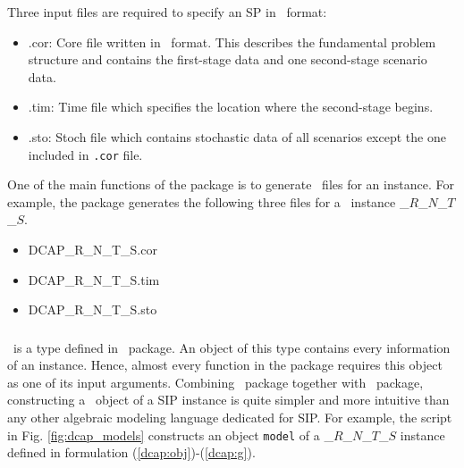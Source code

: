 Three input files are required to specify an SP in \smps\ format:
\begin{itemize}
	\item .cor: Core file written in \mps\ format. This describes the fundamental problem structure and contains the first-stage data and one second-stage scenario data.
	\item .tim: Time file which specifies the location where the second-stage begins.
	\item .sto: Stoch file which contains stochastic data of all scenarios except the one included in \texttt{.cor} file.
\end{itemize}
One of the main functions of the package is to generate \smps\ files for an instance. For example, the package generates the following three files for a \dcap\ instance \dcap\_$R$\_$N$\_$T$\_$S$.
\begin{itemize}
	\item DCAP\_R\_N\_T\_S.cor
	\item DCAP\_R\_N\_T\_S.tim
	\item DCAP\_R\_N\_T\_S.sto
\end{itemize}

\subsubsection{\jumpmodel}
\jumpmodel\ is a type defined in \jump\ package. An object of this type contains every information of an instance. Hence, almost every function in the package requires this object as one of its input arguments. Combining \structjump\ package together with \jump\ package, constructing a \jumpmodel\ object of a SIP instance is quite simpler and more intuitive than any other algebraic modeling language dedicated for SIP. For example, the script in Fig. \ref{fig:dcap_models} constructs an object \texttt{model} of a \dcap\_$R$\_$N$\_$T$\_$S$ instance defined in formulation (\ref{dcap:obj})-(\ref{dcap:g}).

